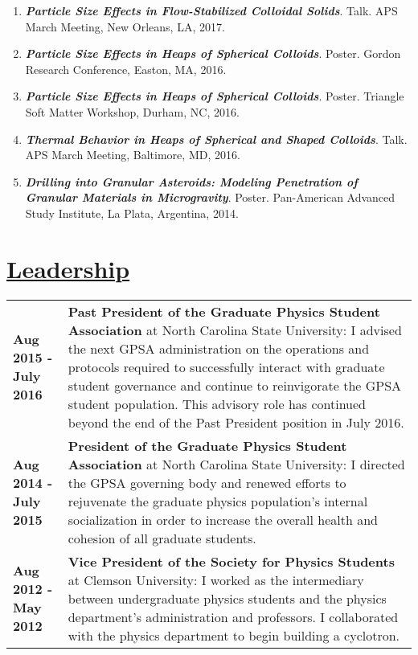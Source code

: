 \documentclass[]{deedy-resume-openfont}
\begin{document}
\begin{minipage}[t]{.90\textwidth}
\begin{flushleft}
\begin{enumerate}
\item\textbf{\textit{Particle Size Effects in Flow-Stabilized Colloidal Solids}}. Talk. APS March Meeting, New Orleans, LA, 2017.

\item\textbf{\textit{Particle Size Effects in Heaps of Spherical Colloids}}. Poster. Gordon Research Conference, Easton, MA, 2016.

\item\textbf{\textit{Particle Size Effects in Heaps of Spherical Colloids}}. Poster. Triangle Soft Matter Workshop, Durham, NC, 2016.

\item\textbf{\textit{Thermal Behavior in Heaps of Spherical and Shaped Colloids}}. Talk. APS March Meeting, Baltimore, MD, 2016.

\item\textbf{\textit{Drilling into Granular Asteroids: Modeling Penetration of Granular Materials in Microgravity}}. Poster. Pan-American Advanced Study Institute, La Plata, Argentina, 2014.
\end{enumerate}
\end{flushleft}


\section{\underline{Leadership}}
\runsubsection{}
\begin{flushleft}
\begin{tabular}{p{}p{}}
\textbf{Aug 2015 - July 2016}    &   \textbf{Past President of the Graduate Physics Student Association} at North Carolina State University: I advised the next GPSA administration on the operations and protocols required to successfully interact with graduate student governance and continue to reinvigorate the GPSA student population. This advisory role has continued beyond the end of the Past President position in July 2016.\\
\textbf{Aug 2014 - July 2015}	&	\textbf{President of the Graduate Physics Student Association} at North Carolina State University: I directed the GPSA governing body and renewed efforts to rejuvenate the graduate physics population's internal socialization in order to increase the overall health and cohesion of all graduate students. \\
\textbf{Aug 2012 - May 2012}	&	\textbf{Vice President of the Society for Physics Students} at Clemson University: I worked as the intermediary between undergraduate physics students and the physics department's administration and professors. I collaborated with the physics department to begin building a cyclotron. \\
\end{tabular}
\end{flushleft}


\end{minipage}
\end{document}
